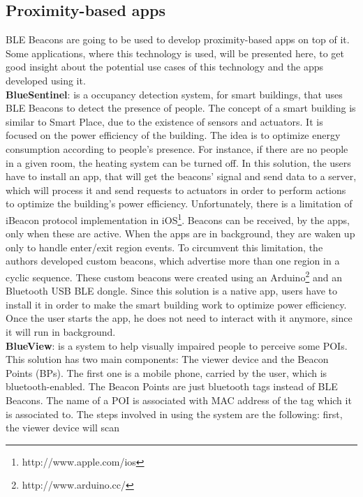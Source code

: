 \subsection{Proximity-based apps}
\label{sub:background_ble_beacons_applications}
BLE Beacons are going to
be used to develop proximity-based apps
on top of it. Some
applications, where this technology is used,
will be presented here, to
get good insight about the potential use cases of this
technology and the apps developed using it.
\\
\textbf{BlueSentinel}\cite{Conte2014}: is a
occupancy detection system, for smart buildings,
that uses BLE Beacons to detect the presence of
people. The concept of a smart building
is similar to Smart Place,
due to the existence of sensors and actuators.
It is focused on the power efficiency of the
building. The idea is to optimize energy
consumption according to people's presence.
For instance, if there are no people in a given room,
the heating system can be turned off.
In this solution, the users have to install
an app, that will get the beacons' signal and
send data to a server, which will process it
and send requests to actuators in order to
perform actions to optimize the
building's power efficiency.
Unfortunately, there is a limitation
of iBeacon protocol implementation
in iOS\footnote{http://www.apple.com/ios}.
Beacons can be received, by the apps,
only when these are active. When the apps are in
background, they are waken up only to handle
enter/exit region events. To circumvent this
limitation, the authors developed custom
beacons, which advertise more than one region
in a cyclic sequence. These custom beacons
were created using an
Arduino\footnote{http://www.arduino.cc/}
and an Bluetooth USB BLE dongle.
Since this solution is a native app,
users have to install it in order
to make the smart building work to
optimize power efficiency.
Once the user starts the app, he does not
need to interact with it anymore, since it
will run in background.
\\
\textbf{BlueView}\cite{Chen2013}: is a system to help
visually impaired people to perceive some POIs.
This solution has two main components: The viewer device
and the Beacon Points (BPs). The first one is a mobile phone,
carried by the user, which is bluetooth-enabled.
The Beacon Points are just bluetooth tags instead of
BLE Beacons. The name of a POI is associated with
MAC address of the tag which it is associated to.
The steps involved in using the system are the
following: first, the viewer device will scan
